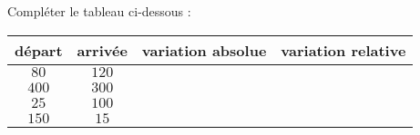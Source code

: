 \documentclass[
	classe=$2^{de}$,
	landscape,
	twocolumn,
	headerTitle={Interrogation 15 min.}
]{évaluation}
\begin{document}
\begin{exercice}
	Compléter le tableau ci-dessous :
	\begin{center}
		\begin{tabular}{|c|c|c|c|}
			\hline
			départ & arrivée & variation absolue   & variation relative   \\ \hline
			$80$   & $120$   & \correction{$40$}   & \correction{$0,5$}   \\ \hline
			$400$  & $300$   & \correction{$-100$} & \correction{$-0,25$} \\ \hline
			$25$   & $100$   & \correction{$75$}   & \correction{$3$}     \\ \hline
			$150$  & $15$    & \correction{$-135$} & \correction{$-0,9$}  \\ \hline
		\end{tabular}
	\end{center}
\end{exercice}
\end{document}
